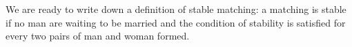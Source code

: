 {\begin{code}
\AgdaSpace{}%
\AgdaSymbol{)))}\<%
\\
%
\>[2]\<%
\\
%
\>[2]\AgdaSymbol{(}\AgdaSpace{}%
\AgdaSymbol{(}\AgdaSpace{}%
\AgdaSymbol{(}\AgdaSpace{}%
\AgdaOperator{\AgdaFunction{≻[}}\AgdaSpace{}%
\AgdaSpace{}%
\AgdaOperator{\AgdaFunction{]}}\AgdaSpace{}%
\AgdaSymbol{)}\AgdaSpace{}%
\AgdaSpace{}%
\AgdaSymbol{(}\AgdaSpace{}%
\AgdaOperator{\AgdaFunction{≻[}}\AgdaSpace{}%
\AgdaSpace{}%
\AgdaOperator{\AgdaFunction{]}}\AgdaSpace{}%
\AgdaSymbol{)))}\<%
\end{code}

We are ready to write down a definition of stable matching: a matching is stable if no man are waiting to be married and the condition of stability is satisfied for every two pairs of man and woman formed.

}
